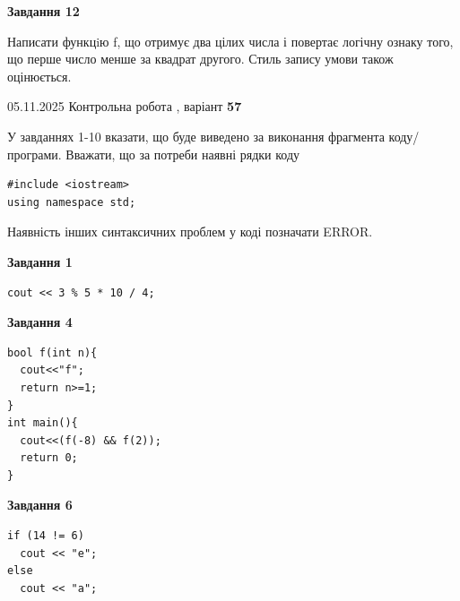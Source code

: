 \documentclass[12pt, ukrainian]{article}
\begin{document}
{\begin {large}
\begin{minipage}[t]{11.0cm}
\begin{center}
\textbf{Завдання 12}
\end{center}

Написати функцiю f, що отримує два цілих числа і повертає логічну ознаку того, що перше число менше за квадрат другого. Стиль запису умови також оцінюється.\par

\end{minipage}

\end {large}}
\newpage

{\Large{05.11.2025 Контрольна робота , варіант  \No \textbf { 57 }\par}}
{
\begin {large}
У завданнях 1-10 вказати, що буде виведено за виконання фрагмента коду/про\-гра\-ми.
Вважати, що за потреби наявні рядки коду
\begin{verbatim}
#include <iostream>
using namespace std;
\end{verbatim}
Наявність інших синтаксичних проблем у коді позначати ERROR.

\begin{minipage}[t]{7.0cm}

\begin{center}
\textbf{Завдання 1}
\end{center}
\vspace{-8mm}

\begin{verbatim}
cout << 3 % 5 * 10 / 4;
\end{verbatim}



\begin{center}
\textbf{Завдання 4}
\end{center}
\vspace{-8mm}

\begin{verbatim}
bool f(int n){
  cout<<"f";
  return n>=1;
}
int main(){
  cout<<(f(-8) && f(2));
  return 0;
}
\end{verbatim}



\begin{center}
\textbf{Завдання 6}
\end{center}
\vspace{-8mm}

\begin{verbatim}
if (14 != 6)
  cout << "e";
else
  cout << "a";
\end{verbatim}




\end{minipage}
\end{large}}
\end{document}
